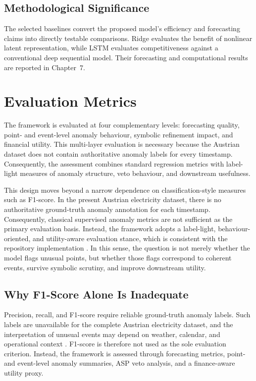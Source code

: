 \subsection{Methodological Significance}

The selected baselines convert the proposed model's efficiency and forecasting claims into directly testable comparisons. Ridge evaluates the benefit of nonlinear latent representation, while LSTM evaluates competitiveness against a conventional deep sequential model. Their forecasting and computational results are reported in Chapter~7.


\section{Evaluation Metrics}
\label{sec:evaluation_metrics}

The framework is evaluated at four complementary levels: forecasting quality, point- and event-level anomaly behaviour, symbolic refinement impact, and financial utility. This multi-layer evaluation is necessary because the Austrian dataset does not contain authoritative anomaly labels for every timestamp. Consequently, the assessment combines standard regression metrics with label-light measures of anomaly structure, veto behaviour, and downstream usefulness.

This design moves beyond a narrow dependence on classification-style measures such as F1-score. In the present Austrian electricity dataset, there is no authoritative ground-truth anomaly annotation for each timestamp. Consequently, classical supervised anomaly metrics are not sufficient as the primary evaluation basis. Instead, the framework adopts a label-light, behaviour-oriented, and utility-aware evaluation stance, which is consistent with the repository implementation \cite{repo_thesis_grid_anomaly}. In this sense, the question is not merely whether the model flags unusual points, but whether those flags correspond to coherent events, survive symbolic scrutiny, and improve downstream utility.

\subsection{Why F1-Score Alone Is Inadequate}

Precision, recall, and F1-score require reliable ground-truth anomaly labels.
Such labels are unavailable for the complete Austrian electricity dataset, and
the interpretation of unusual events may depend on weather, calendar, and
operational context
\cite{chandola2009anomaly,blazquez2021review}. F1-score is therefore not used as
the sole evaluation criterion. Instead, the framework is assessed through
forecasting metrics, point- and event-level anomaly summaries, ASP veto analysis,
and a finance-aware utility proxy.


